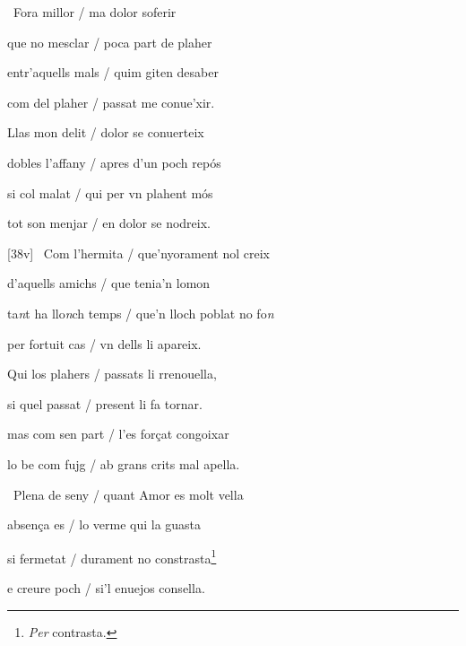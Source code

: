 \begin{estrofa}

 \textparagraph\  Fora millor / ma dolor soferir

 que no mesclar / poca part de plaher

 entr'aquells mals / quim giten desaber

 com del plaher / passat  me conue'xir.

 Llas mon delit / dolor se conuerteix

 dobles l'affany / apres d'un poch rep\'{o}s

 si col malat / qui per vn plahent m\'{o}s

 tot son menjar / en dolor se nodreix.

\end{estrofa}



\begin{estrofa}

 [38v] \textparagraph\  Com l'hermita / que'nyorament nol creix

 d'aquells amichs / que tenia'n lomon

 ta\textit{n}t ha llo\textit{n}ch temps / que'n lloch poblat no fo\textit{n}

 per fortuit cas / vn dells li apareix.

 Qui los plahers / passats li rrenouella,

 si quel passat / present li fa tornar.

 mas com sen part / l'es for\c{c}at congoixar

 lo be com fujg / ab grans crits mal apella.

\end{estrofa}



\begin{tornada}

 \textparagraph\  Plena de seny / quant Amor es molt vella

 absen\c{c}a es / lo verme qui la guasta

 si fermetat / durament no constrasta\footnote{\textit{Per} contrasta.}

 e creure poch / si'l enuejos consella.

\end{tornada}





